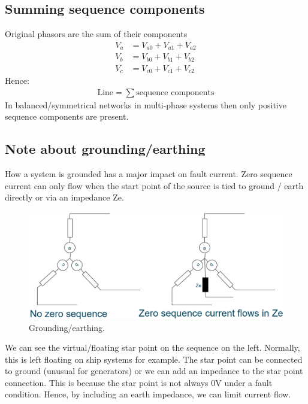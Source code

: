 \documentclass[class=report, crop=false, 12pt,a4paper]{standalone}
\begin{document}
\subsection{Summing sequence components}
Original phasors are the sum of their components
\begin{align}
	V_a &= V_{a0} + V_{a1} + V_{a2}\\
	V_b &= V_{b0} + V_{b1} + V_{b2}\\
	V_c &= V_{c0} + V_{c1} + V_{c2}
\end{align}
Hence:
\begin{gather}
	\textrm{Line} = \sum \textrm{sequence components}
\end{gather}
In balanced/symmetrical networks in multi-phase systems then only positive sequence components are present.
\subsection{Note about grounding/earthing}
How a system is grounded has a major impact on fault current. Zero sequence current can only flow when the start point of the source is tied to ground / earth directly or via an impedance Ze. 
\begin{figure}[H]
	\centering
	\includegraphics[width = \textwidth]{../img/figure24.png}
	\caption{Grounding/earthing.}
\end{figure}
We can see the virtual/floating star point on the sequence on the left. Normally, this is left floating on ship systems for example. The star point can be connected to ground (unusual for generators) or we can add an impedance to the star point connection. This is because the star point is not always 0V under a fault condition. Hence, by including an earth impedance, we can limit current flow.
\end{document}
